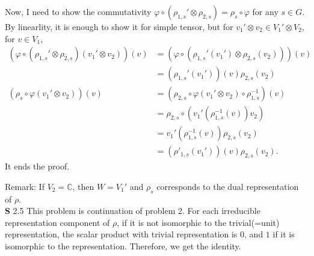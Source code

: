 \documentclass[a4paper, 12pt]{article}
\theoremstyle{Mydefinition}
\theoremstyle{Mytheorem}
\begin{document}
Now, I need to show the commutativity $\varphi\circ \left(\rho_{1,s}'\otimes \rho_{2,s}\right) =\rho_s\circ \varphi$ for any $s\in G$. By linearlity, it is enough to show it for simple tensor, but for $v_1'\otimes v_2\in V_1'\otimes V_2$, for $v\in V_1$,
\begin{equation}
    \begin{split}
        \left(\varphi\circ \left(\rho_{1,s}'\otimes \rho_{2,s}\right)(v_1'\otimes v_2)\right)(v) &= \left(\varphi\circ \left(\rho_{1,s}'(v_1')\otimes \rho_{2,s}(v_2)\right)\right)(v)\\
        &=\left(\rho_{1,s}'(v_1')\right)(v)\rho_{2,s}(v_2)\\
        \left(\rho_s\circ \varphi(v_1'\otimes v_2)\right)(v) &=\left(\rho_{2,s}\circ \varphi(v_1'\otimes v_2)\circ \rho_{1,s}^{-1}\right)(v)\\
        &=\rho_{2,s}\circ \left(v_1'(\rho_{1,s}^{-1}(v))v_2\right)\\
        &=v_1'(\rho_{1,s}^{-1}(v))\rho_{2,s}(v_2)\\
        &=\left(\rho'_{1,s}(v_1')\right)(v)\rho_{2,s}(v_2).
    \end{split}
\end{equation}
It ends the proof.

Remark: If $V_2=\mathbb{C}$, then $W=V_1'$ and $\rho_s$ corresponds to the dual representation of $\rho$.\\

\noindent \textbf{S} 2.5
This problem is continuation of problem 2. For each irreducible representation component of $\rho$, if it is not isomorphic to the trivial(=unit) representation, the scalar product with trivial representation is $0$, and $1$ if it is isomorphic to the representation. Therefore, we get the identity.\\
\end{document}

